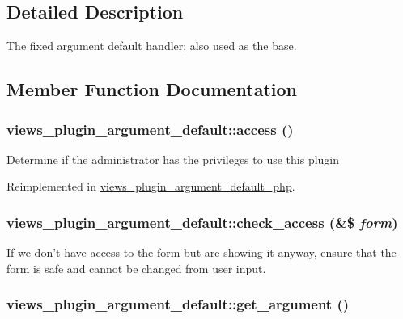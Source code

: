 \subsection{Detailed Description}
The fixed argument default handler; also used as the base. 

\subsection{Member Function Documentation}
\hypertarget{classviews__plugin__argument__default_47b0a69da2fb0e45c25aa9c8727f912f}{
\subsubsection[{access}]{\setlength{\rightskip}{0pt plus 5cm}views\_\-plugin\_\-argument\_\-default::access ()}}
\label{classviews__plugin__argument__default_47b0a69da2fb0e45c25aa9c8727f912f}


Determine if the administrator has the privileges to use this plugin 

Reimplemented in \hyperlink{classviews__plugin__argument__default__php_ff864fbd2dcbea7ecd3589429bbf3a2a}{views\_\-plugin\_\-argument\_\-default\_\-php}.\hypertarget{classviews__plugin__argument__default_80d65e0fc0a62ee3576d50875ffc7f22}{
\subsubsection[{check\_\-access}]{\setlength{\rightskip}{0pt plus 5cm}views\_\-plugin\_\-argument\_\-default::check\_\-access (\&\$ {\em form})}}
\label{classviews__plugin__argument__default_80d65e0fc0a62ee3576d50875ffc7f22}


If we don't have access to the form but are showing it anyway, ensure that the form is safe and cannot be changed from user input. \hypertarget{classviews__plugin__argument__default_8e67864f4a1ce20b12bc82afe1acd255}{
\subsubsection[{get\_\-argument}]{\setlength{\rightskip}{0pt plus 5cm}views\_\-plugin\_\-argument\_\-default::get\_\-argument ()}}
\label{classviews__plugin__argument__default_8e67864f4a1ce20b12bc82afe1acd255}


